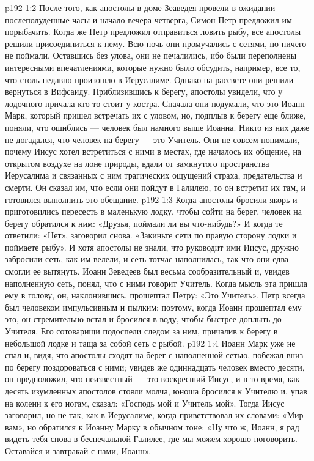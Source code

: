 \vs p192 1:2 После того, как апостолы в доме Зеаведея провели в ожидании послеполуденные часы и начало вечера четверга, Симон Петр предложил им порыбачить. Когда же Петр предложил отправиться ловить рыбу, все апостолы решили присоединиться к нему. Всю ночь они промучались с сетями, но ничего не поймали. Оставшись без улова, они не печалились, ибо были переполнены интересными впечатлениями, которые нужно было обсудить, например, все то, что столь недавно произошло в Иерусалиме. Однако на рассвете они решили вернуться в Вифсаиду. Приблизившись к берегу, апостолы увидели, что у лодочного причала кто\hyp{}то стоит у костра. Сначала они подумали, что это Иоанн Марк, который пришел встречать их с уловом, но, подплыв к берегу еще ближе, поняли, что ошиблись --- человек был намного выше Иоанна. Никто из них даже не догадался, что человек на берегу --- это Учитель. Они не совсем понимали, почему Иисус хотел встретиться с ними в местах, где началось их общение, на открытом воздухе на лоне природы, вдали от замкнутого пространства Иерусалима и связанных с ним трагических ощущений страха, предательства и смерти. Он сказал им, что если они пойдут в Галилею, то он встретит их там, и готовился выполнить это обещание.
\vs p192 1:3 Когда апостолы бросили якорь и приготовились пересесть в маленькую лодку, чтобы сойти на берег, человек на берегу обратился к ним: «Друзья, поймали ли вы что\hyp{}нибудь?» И когда те ответили: «Нет», заговорил снова. «Закиньте сети по правую сторону лодки и поймаете рыбу». И хотя апостолы не знали, что руководит ими Иисус, дружно забросили сеть, как им велели, и сеть тотчас наполнилась, так что они едва смогли ее вытянуть. Иоанн Зеведеев был весьма сообразительный и, увидев наполненную сеть, понял, что с ними говорит Учитель. Когда мысль эта пришла ему в голову, он, наклонившись, прошептал Петру: «Это Учитель». Петр всегда был человеком импульсивным и пылким; поэтому, когда Иоанн прошептал ему это, он стремительно встал и бросился в воду, чтобы быстрее доплыть до Учителя. Его сотоварищи подоспели следом за ним, причалив к берегу в небольшой лодке и таща за собой сеть с рыбой.
\vs p192 1:4 Иоанн Марк уже не спал и, видя, что апостолы сходят на берег с наполненной сетью, побежал вниз по берегу поздороваться с ними; увидев же одиннадцать человек вместо десяти, он предположил, что неизвестный --- это воскресший Иисус, и в то время, как десять изумленных апостолов стояли молча, юноша бросился к Учителю и, упав на колени к его ногам, сказал: «Господь мой и Учитель мой». Тогда Иисус заговорил, но не так, как в Иерусалиме, когда приветствовал их словами: «Мир вам», но обратился к Иоанну Марку в обычном тоне: «Ну что ж, Иоанн, я рад видеть тебя снова в беспечальной Галилее, где мы можем хорошо поговорить. Оставайся и завтракай с нами, Иоанн».
